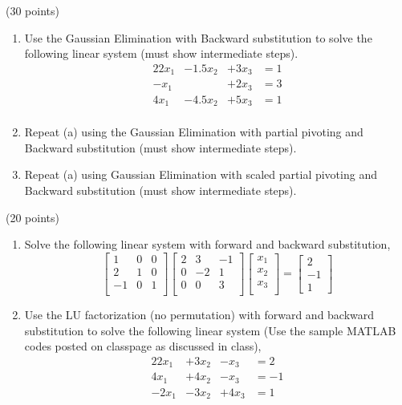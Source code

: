 \documentclass[10pt]{jhwhw}
\begin{document}
\solution

\problem{} (30 points)

	\begin{enumerate}
		\item Use the Gaussian Elimination with Backward substitution to solve the following
			linear system (must show intermediate steps).
			\begin{alignat*}{2}
				2x_1 &- 1.5x_2 &+ 3x_3 &= 1 \\
				-x_1 &         &+ 2x_3 &= 3 \\
				4x_1 &- 4.5x_2 &+ 5x_3 &= 1 \\
			\end{alignat*}
		\item Repeat (a) using the Gaussian Elimination with partial pivoting and Backward
			substitution (must show intermediate steps).
		\item Repeat (a) using Gaussian Elimination with scaled partial pivoting and 
			Backward substitution (must show intermediate steps).
	\end{enumerate}

\solution

\problem{} (20 points)

	\begin{enumerate}
		\item Solve the following linear system with forward and backward substitution,
			$$
			\begin{bmatrix}
				1 & 0 & 0 \\
				2 & 1 & 0 \\
				-1 & 0 & 1 \\
			\end{bmatrix}
			\begin{bmatrix}
				2 & 3 & -1 \\
				0 & -2 & 1 \\
				0 & 0 & 3 \\
			\end{bmatrix}
			\begin{bmatrix}
				x_1 \\ x_2 \\ x_3 \\
			\end{bmatrix} = 
			\begin{bmatrix}
				2 \\ -1 \\ 1
			\end{bmatrix}
			$$
		\item Use the LU factorization (no permutation) with forward and backward
			substitution to solve the following linear system (Use the sample MATLAB
			codes posted on classpage as discussed in class),
			\begin{alignat*}{2}
				2x_1 &+ 3x_2 &- x_3 &= 2 \\
				4x_1 &+ 4x_2 &- x_3 &= -1 \\
				-2x_1 &- 3x_2 &+ 4x_3 &= 1
			\end{alignat*}
	\end{enumerate}
\end{document}
